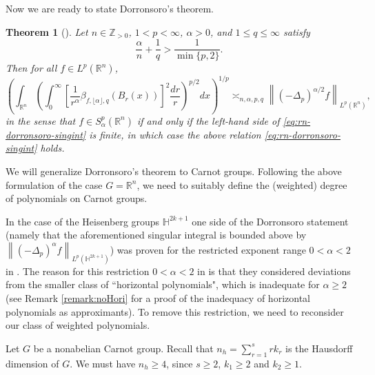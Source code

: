 \documentclass[11pt,reqno]{amsart}
\newtheorem{theorem}{Theorem}
\newcommand{\1}{\mathbf 1}
\begin{document}
Now we are ready to state Dorronsoro's theorem.
\begin{theorem}[{\cite[Theorem 2, Theorem 6]{dorronsoro1985characterization}}]\label{Euclidean-lpgenthm}
Let $n\in \mathbb{Z}_{>0}$, $1<p<\infty$, $\alpha>0$, and $1\le q\le\infty$ satisfy
\begin{equation*}
\frac{\alpha}{n}+\frac 1q>\frac{1}{\min\{p,2\}}.\end{equation*}
Then for all $f\in L^p\left(\mathbb{R}^n\right)$,
\begin{equation}\label{eq:rn-dorronsoro-singint}
\left(\int_{\mathbb{R}^n} \left(\int_0^\infty \left[\frac 1{r^\alpha} \beta_{f,\lfloor \alpha \rfloor,q}\left(B_r\left(x\right)\right) \right]^2 \frac{dr}{r} \right)^{p/2} dx \right)^{1/p} \asymp_{n,\alpha,p,q} \left\|\left(-\Delta_p\right)^{\alpha/2} f\right\|_{L^p\left(\mathbb{R}^n\right)},
\end{equation}
in the sense that $f\in S^p_\alpha\left(\mathbb{R}^n\right)$ if and only if the left-hand side of \eqref{eq:rn-dorronsoro-singint} is finite, in which case the above relation \eqref{eq:rn-dorronsoro-singint} holds.
\end{theorem}

We will generalize Dorronsoro's theorem to Carnot groups. Following the above formulation of the case $G=\mathbb{R}^n$, we need to suitably define the (weighted) degree of polynomials on Carnot groups.

In the case of the Heisenberg groups $\mathbb{H}^{2k+1}$ one side of the Dorronsoro statement (namely that the aforementioned singular integral is bounded above by $\left\|\left(-\Delta_p\right)^\alpha f\right\|_{L^p\left(\mathbb{H}^{2k+1}\right)}$) was proven for the restricted exponent range $0<\alpha<2$ in \cite{fassler2020dorronsoro}. The reason for this restriction $0<\alpha<2$ in \cite{fassler2020dorronsoro} is that they considered deviations from the smaller class of ``horizontal polynomials", which is inadequate for $\alpha\ge 2$ (see Remark \ref{remark:noHori} for a proof of the inadequacy of horizontal polynomials as approximants). To remove this restriction, we need to reconsider our class of weighted polynomials.



Let $G$ be a nonabelian Carnot group. Recall that $n_h= \sum_{r=1}^s rk_r$ is the Hausdorff dimension of $G$. We must have $n_h\ge 4$, since $s\ge 2$, $k_1\ge 2$ and $k_2\ge 1$.
\end{document}
